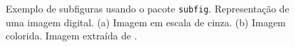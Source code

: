 \begin{figure}[ht]
    \centering
    \caption{Exemplo de subfiguras usando o pacote \texttt{subfig}. Representação de uma imagem digital. (a) Imagem em escala de cinza. (b) Imagem colorida. Imagem extraída de \parencite{Barbosa2020}.}
    \label{fig:subfig}
\end{figure}

